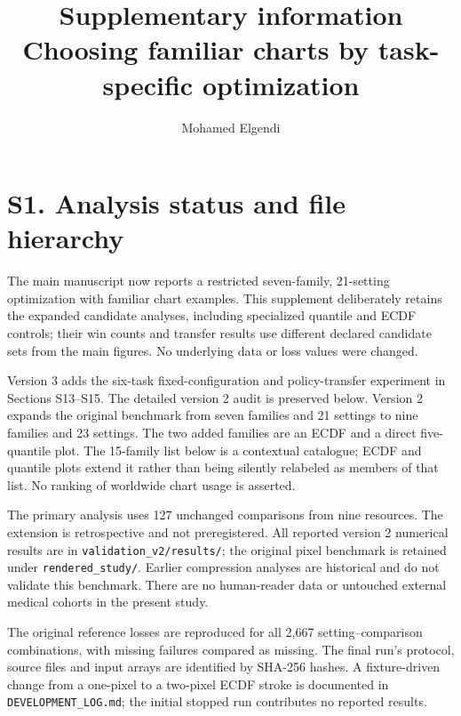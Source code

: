 \documentclass[10pt]{article}
\title{Supplementary information\\Choosing familiar charts by task-specific optimization}
\author{Mohamed Elgendi}\date{}
\begin{document}
\maketitle
\section*{S1. Analysis status and file hierarchy}
The main manuscript now reports a restricted seven-family, 21-setting optimization with familiar chart examples. This supplement deliberately retains the expanded candidate analyses, including specialized quantile and ECDF controls; their win counts and transfer results use different declared candidate sets from the main figures. No underlying data or loss values were changed.

Version 3 adds the six-task fixed-configuration and policy-transfer experiment in Sections S13--S15. The detailed version 2 audit is preserved below. Version 2 expands the original benchmark from seven families and 21 settings to nine families and 23 settings. The two added families are an ECDF and a direct five-quantile plot. The 15-family list below is a contextual catalogue; ECDF and quantile plots extend it rather than being silently relabeled as members of that list. No ranking of worldwide chart usage is asserted.

The primary analysis uses 127 unchanged comparisons from nine resources. The extension is retrospective and not preregistered. All reported version 2 numerical results are in \texttt{validation\_v2/results/}; the original pixel benchmark is retained under \texttt{rendered\_study/}. Earlier compression analyses are historical and do not validate this benchmark. There are no human-reader data or untouched external medical cohorts in the present study.

The original reference losses are reproduced for all 2,667 setting--comparison combinations, with missing failures compared as missing. The final run's protocol, source files and input arrays are identified by SHA-256 hashes. A fixture-driven change from a one-pixel to a two-pixel ECDF stroke is documented in \texttt{DEVELOPMENT\_LOG.md}; the initial stopped run contributes no reported results.
\end{document}
